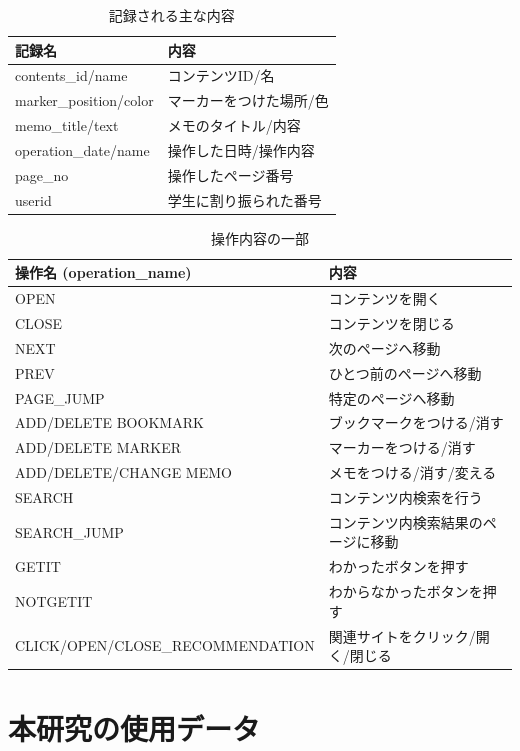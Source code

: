 \documentclass[a4paper,12pt]{ltjsreport}
\begin{document}
\begin{table}[tbp]
  \centering
  \caption{記録される主な内容}
  \label{tb:kirokunaiyou}
  \begin{tabular}{l|l}
    記録名 & 内容 \\ \hline
    contents\_id/name & コンテンツID/名 \\ 
    marker\_position/color & マーカーをつけた場所/色 \\ 
    memo\_title/text & メモのタイトル/内容 \\
    operation\_date/name & 操作した日時/操作内容 \\  
    page\_no & 操作したページ番号 \\ 
    userid & 学生に割り振られた番号 \\ \hline
  \end{tabular}
\end{table}

\begin{table}[tbp]
  \centering
  \caption{操作内容の一部}
  \label{tb:operationname}
  \begin{tabular}{l|l}
    操作名  (operation\_name)  & 内容 \\ \hline
    OPEN & コンテンツを開く \\ 
    CLOSE & コンテンツを閉じる \\ 
    NEXT & 次のページへ移動 \\
    PREV & ひとつ前のページへ移動 \\ 
    PAGE\_JUMP & 特定のページへ移動 \\ 
    ADD/DELETE BOOKMARK & ブックマークをつける/消す \\
    ADD/DELETE MARKER & マーカーをつける/消す \\
    ADD/DELETE/CHANGE MEMO & メモをつける/消す/変える \\ %
    SEARCH & コンテンツ内検索を行う \\
    SEARCH\_JUMP & コンテンツ内検索結果のページに移動 \\
    GETIT & わかったボタンを押す \\ 
    NOTGETIT & わからなかったボタンを押す \\
    CLICK/OPEN/CLOSE\_RECOMMENDATION & 関連サイトをクリック/開く/閉じる \\ \hline
  \end{tabular}
\end{table}


\section{本研究の使用データ}\label{sec:data}
\end{document}
